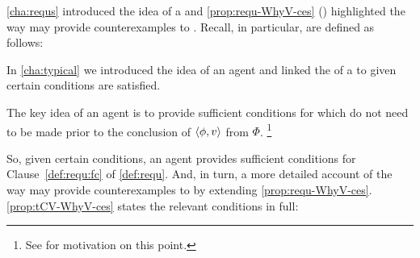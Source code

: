 \begin{note}
  \autoref{cha:requs} introduced the idea of a \requ{} and \autoref{prop:requ-WhyV-ces} () highlighted the way  may provide counterexamples to \issueInclusion{}.
  Recall, in particular,  are defined as follows:


  \noindent%
  In \autoref{cha:typical} we introduced the idea of an agent \tCV{} and linked the \tpro{} of a \torNa{} to  given certain conditions are satisfied.

  The key idea of an agent \tCV{} is to provide sufficient conditions for  which do not need to be made prior to the \agents{} conclusion of \(\langle\phi, v\rangle\) from \(\Phi\).%
  \footnote{
    See  for motivation on this point.
  }

  So, given certain conditions, an agent \tCV{} provides sufficient conditions for Clause~\ref{def:requ:fc} of \autoref{def:requ}.
  And, in turn, a more detailed account of the way  may provide counterexamples to \issueInclusion{} by extending \autoref{prop:requ-WhyV-ces}.
  \autoref{prop:tCV-WhyV-ces} states the relevant conditions in full:


\end{note}
